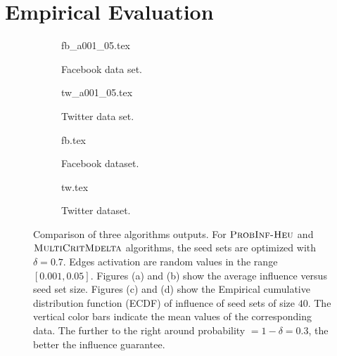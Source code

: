 \vspace{-0.1in}
\section{Empirical Evaluation}
\label{sec:expt}

\begin{figure*}[t]
\resizebox{\textwidth}{!}
{
\begin{subfigure}[t]{.45\textwidth}
  \captionsetup{skip=-8pt}
  {fb_a001_05.tex}
  \caption{Facebook data set.}
  \label{fig:combine-a}
\end{subfigure}
\begin{subfigure}[t]{.45\textwidth}
  \captionsetup{skip=-8pt}
  {tw_a001_05.tex}
  \caption{Twitter data set.}
  \label{fig:combine-b}
\end{subfigure}
%
\begin{subfigure}[t]{.45\textwidth}
  \captionsetup{skip=4pt}
  {fb.tex}
  \caption{Facebook dataset.}
  \label{fig:combine-c}
\end{subfigure}
\begin{subfigure}[t]{.45\textwidth}
  \captionsetup{skip=4pt}
  {tw.tex}
  \caption{Twitter dataset.}
  \label{fig:combine-d}
\end{subfigure}
}
\captionsetup{belowskip=-0.1in}
\caption{
\small
Comparison of three algorithms outputs. For $\textsc{ProbInf-Heu}$ and $\textsc{MultiCritMdelta}$ algorithms, the seed sets are optimized with
$\delta=0.7$. Edges activation are random values in the range $[0.001,0.05]$.
Figures (a) and (b) show the average influence versus seed set size.
Figures (c) and (d) show the Empirical cumulative distribution function (ECDF) of influence of
seed sets of size $40$. The vertical color bars indicate the mean values of the
corresponding data.
The further to the right around probability $=1 - \delta = 0.3$, the
better the influence guarantee.}
\label{fig:combine}
\end{figure*}

